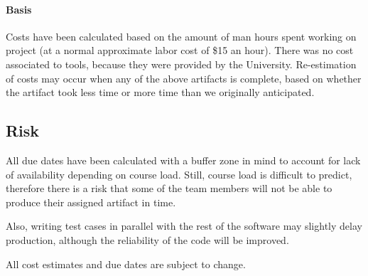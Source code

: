 \documentclass{article}
\begin{document}
\paragraph{Basis} Costs have been calculated based on the amount of man hours spent working on project (at a normal approximate labor cost of \$15 an hour). There was no cost associated to tools, because they were provided by the University. 
Re-estimation of costs may occur when any of the above artifacts is complete, based on whether the artifact took less time or more time than we originally anticipated.

\subsection{Risk}

	All due dates have been calculated with a buffer zone in mind to account for lack of availability depending on course load. Still, course load is difficult to predict, therefore there is a risk that some of the team members will not be able to produce their assigned artifact in time.

Also, writing test cases in parallel with the rest of the software may slightly delay production, although the reliability of the code will be improved.

All cost estimates and due dates are subject to change.

\break
\listoffigures
\end{document}
